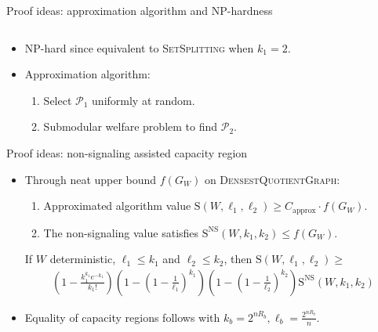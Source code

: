 \documentclass{beamer}
\theoremstyle{definition}
\theoremstyle{remark}
\begin{document}
\begin{frame}{Proof ideas: approximation algorithm and \textrm{NP}-hardness}
\begin{columns}
\begin{column}{4cm}
\begin{center}
      \end{center}
    \end{column}
  \end{columns}
  \pause\pause\pause\pause\bigskip
  \begin{itemize}
  \item \textrm{NP}-hard since equivalent to \textsc{SetSplitting} when $k_1=2$.
    \pause
    \bigskip
  \item Approximation algorithm:
    \begin{enumerate}
    \item Select $\mathcal{P}_1$ uniformly at random.
    \item Submodular welfare problem to find $\mathcal{P}_2$.
    \end{enumerate}
  \end{itemize}
\end{frame}

\begin{frame}{Proof ideas: non-signaling assisted capacity region}
  \begin{itemize}

  \item Through neat upper bound $f(G_W)$ on \textsc{DensestQuotientGraph}:
    \begin{enumerate}
    \item Approximated algorithm value $\mathrm{S}(W,\ell_1,\ell_2) \geq C_{\text{approx}} \cdot f(G_W)$.
    \item The non-signaling value satisfies $\mathrm{S}^{\mathrm{NS}}(W,k_1,k_2) \leq f(G_W)$.
    \end{enumerate}
    \pause
    \begin{theorem}
      \label{theo:NSdet}
      If $W$ deterministic, $\ell_1 \leq k_1$ and $\ell_2 \leq k_2$, then $\mathrm{S}(W,\ell_1,\ell_2) \geq$
      \begin{align*}
        \left(1 - \frac{k_1^{k_1}e^{-k_1}}{k_1!}\right)\left(1-\left(1-\frac{1}{\ell_1}\right)^{k_1}\right)\left(1-\left(1-\frac{1}{\ell_2}\right)^{k_2}\right)\mathrm{S}^{\mathrm{NS}}(W,k_1,k_2)
      \end{align*}
    \end{theorem}
    \pause
  \item Equality of capacity regions follows with $k_b=2^{nR_b},\ell_b=\frac{2^{nR_b}}{n}$.
  \end{itemize}
\end{frame}
\end{document}
